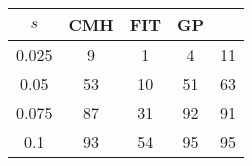 \centering \begin{tabular}{c|c|c|c|c}
$s$	&CMH	&FIT	&GP	&\sc{Clear} \\\hline
0.025	&9	&1	&4	&11\\
0.05	&53	&10	&51	&63\\
0.075	&87	&31	&92	&91\\
0.1	&93	&54	&95	&95\\
\end{tabular}

